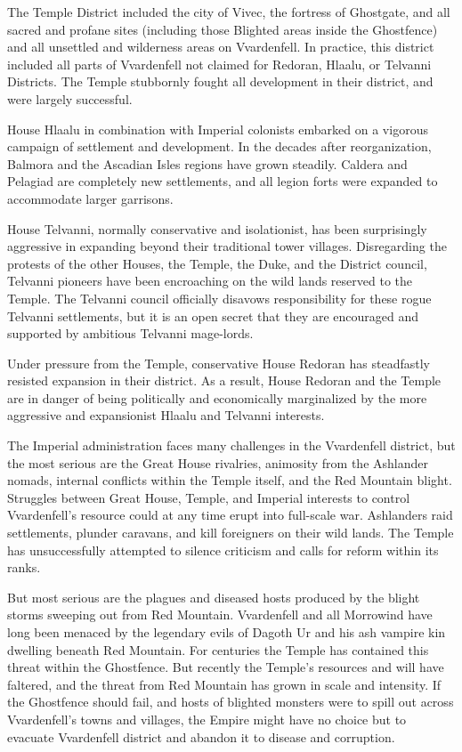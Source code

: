 The Temple District included the city of Vivec, the fortress of Ghostgate, and all sacred and profane sites (including those Blighted areas inside the Ghostfence) and all unsettled and wilderness areas on Vvardenfell. In practice, this district included all parts of Vvardenfell not claimed for Redoran, Hlaalu, or Telvanni Districts. The Temple stubbornly fought all development in their district, and were largely successful.

House Hlaalu in combination with Imperial colonists embarked on a vigorous campaign of settlement and development. In the decades after reorganization, Balmora and the Ascadian Isles regions have grown steadily. Caldera and Pelagiad are completely new settlements, and all legion forts were expanded to accommodate larger garrisons.

House Telvanni, normally conservative and isolationist, has been surprisingly aggressive in expanding beyond their traditional tower villages. Disregarding the protests of the other Houses, the Temple, the Duke, and the District council, Telvanni pioneers have been encroaching on the wild lands reserved to the Temple. The Telvanni council officially disavows responsibility for these rogue Telvanni settlements, but it is an open secret that they are encouraged and supported by ambitious Telvanni mage-lords.

Under pressure from the Temple, conservative House Redoran has steadfastly resisted expansion in their district. As a result, House Redoran and the Temple are in danger of being politically and economically marginalized by the more aggressive and expansionist Hlaalu and Telvanni interests.

The Imperial administration faces many challenges in the Vvardenfell district, but the most serious are the Great House rivalries, animosity from the Ashlander nomads, internal conflicts within the Temple itself, and the Red Mountain blight. Struggles between Great House, Temple, and Imperial interests to control Vvardenfell's resource could at any time erupt into full-scale war. Ashlanders raid settlements, plunder caravans, and kill foreigners on their wild lands. The Temple has unsuccessfully attempted to silence criticism and calls for reform within its ranks.

But most serious are the plagues and diseased hosts produced by the blight storms sweeping out from Red Mountain. Vvardenfell and all Morrowind have long been menaced by the legendary evils of Dagoth Ur and his ash vampire kin dwelling beneath Red Mountain. For centuries the Temple has contained this threat within the Ghostfence. But recently the Temple's resources and will have faltered, and the threat from Red Mountain has grown in scale and intensity. If the Ghostfence should fail, and hosts of blighted monsters were to spill out across Vvardenfell's towns and villages, the Empire might have no choice but to evacuate Vvardenfell district and abandon it to disease and corruption.
